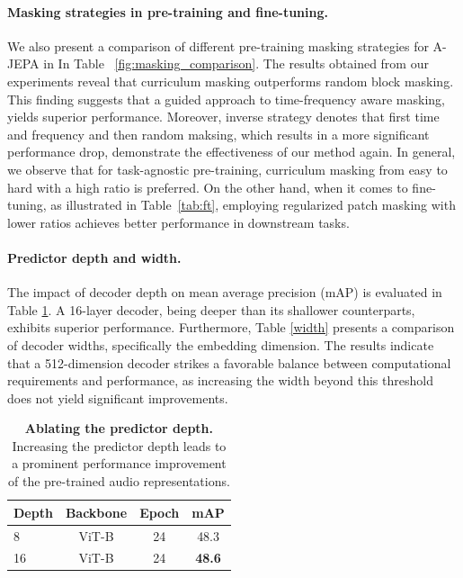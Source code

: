 \documentclass{article}
\begin{document}
\paragraph{Masking strategies in pre-training and fine-tuning.}
We also present a comparison of different pre-training masking strategies for A-JEPA in In Table ~\ref{fig:masking_comparison}.
The results obtained from our experiments reveal that curriculum masking outperforms random block masking. This finding suggests that a guided approach to time-frequency aware masking, yields superior performance. 
Moreover, inverse strategy denotes that first time and frequency and then random maksing, which results in a more significant performance drop, demonstrate the effectiveness of our method again. 
In general, we observe that for task-agnostic pre-training, curriculum masking from easy to hard with a high ratio is preferred. 
On the other hand, when it comes to fine-tuning, as illustrated in Table~\ref{tab:ft}, employing regularized patch masking with lower ratios achieves better performance in downstream tasks.


\paragraph{Predictor depth and width.} 
The impact of decoder depth on mean average precision (mAP) is evaluated in Table \ref{depth}. A 16-layer decoder, being deeper than its shallower counterparts, exhibits superior performance. 
Furthermore, Table \ref{width} presents a comparison of decoder widths, specifically the embedding dimension. The results indicate that a 512-dimension decoder strikes a favorable balance between computational requirements and performance, as increasing the width beyond this threshold does not yield significant improvements.


\begin{table}[t!]
\centering
    \begin{tabular}{lccc}
            \textbf{Depth} &\textbf{Backbone} &\textbf{Epoch} & \textbf{mAP}\\
        \midrule
        8 &ViT-B &24 & 48.3 \\
        16 &ViT-B&24 &\textbf{48.6} \\
          
    \end{tabular}   
    \caption{\textbf{Ablating the predictor depth.} Increasing the predictor depth leads to a prominent performance improvement of the pre-trained audio representations.}
    \label{depth}
\end{table}      
\end{document}
